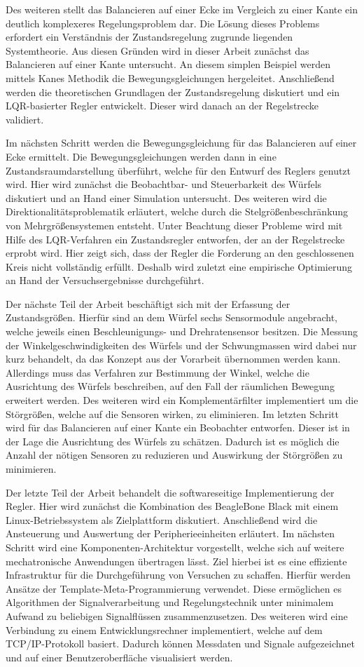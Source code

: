 Des weiteren stellt das Balancieren auf einer Ecke im Vergleich zu einer Kante ein deutlich komplexeres Regelungsproblem dar. Die Lösung dieses Problems erfordert ein Verständnis der Zustandsregelung zugrunde liegenden Systemtheorie. Aus diesen Gründen wird in dieser Arbeit zunächst das Balancieren auf einer Kante untersucht. An diesem simplen Beispiel werden mittels Kanes Methodik die Bewegungsgleichungen hergeleitet. Anschließend werden die theoretischen Grundlagen der Zustandsregelung diskutiert und ein LQR-basierter Regler entwickelt. Dieser wird danach an der Regelstrecke validiert.

Im nächsten Schritt werden die Bewegungsgleichung für das Balancieren auf einer Ecke ermittelt. Die Bewegungsgleichungen werden dann in eine Zustandsraumdarstellung überführt, welche für den Entwurf des Reglers genutzt wird. Hier wird zunächst die Beobachtbar- und Steuerbarkeit des Würfels diskutiert und an Hand einer Simulation untersucht. Des weiteren wird die Direktionalitätsproblematik erläutert, welche durch die Stelgrößenbeschränkung von Mehrgrößensystemen entsteht. Unter Beachtung dieser Probleme wird mit Hilfe des LQR-Verfahren ein Zustandsregler entworfen, der an der Regelstrecke erprobt wird. Hier zeigt sich, dass der Regler die Forderung an den geschlossenen Kreis nicht vollständig erfüllt. Deshalb wird zuletzt eine empirische Optimierung an Hand der Versuchsergebnisse durchgeführt.

Der nächste Teil der Arbeit beschäftigt sich mit der Erfassung der Zustandsgrößen. Hierfür sind an dem Würfel sechs Sensormodule angebracht, welche jeweils einen Beschleunigungs- und Drehratensensor besitzen. Die Messung der Winkelgeschwindigkeiten des Würfels und der Schwungmassen wird dabei nur kurz behandelt, da das Konzept aus der Vorarbeit übernommen werden kann. Allerdings muss das Verfahren zur Bestimmung der Winkel, welche die Ausrichtung des Würfels beschreiben, auf den Fall der räumlichen Bewegung erweitert werden. Des weiteren wird ein Komplementärfilter implementiert um die Störgrößen, welche auf die Sensoren wirken, zu eliminieren. Im letzten Schritt wird für das Balancieren auf einer Kante ein Beobachter entworfen. Dieser ist in der Lage die Ausrichtung des Würfels zu schätzen. Dadurch ist es möglich die Anzahl der nötigen Sensoren zu reduzieren und Auswirkung der Störgrößen zu minimieren.

Der letzte Teil der Arbeit behandelt die softwareseitige Implementierung der Regler. Hier wird zunächst die Kombination des BeagleBone Black mit einem Linux-Betriebssystem als Zielplattform diskutiert. Anschließend wird die Ansteuerung und Auswertung der Peripherieeinheiten erläutert. Im nächsten Schritt wird eine Komponenten-Architektur vorgestellt, welche sich auf weitere mechatronische Anwendungen übertragen lässt. Ziel hierbei ist es eine effiziente Infrastruktur für die Durchgeführung von Versuchen zu schaffen. Hierfür werden Ansätze der Template-Meta-Programmierung verwendet. Diese ermöglichen es Algorithmen der Signalverarbeitung und Regelungstechnik unter minimalem Aufwand zu beliebigen Signalflüssen zusammenzusetzen. Des weiteren wird eine Verbindung zu einem Entwicklungsrechner implementiert, welche auf dem TCP/IP-Protokoll basiert. Dadurch können Messdaten und Signale aufgezeichnet und auf einer Benutzeroberfläche visualisiert werden.

